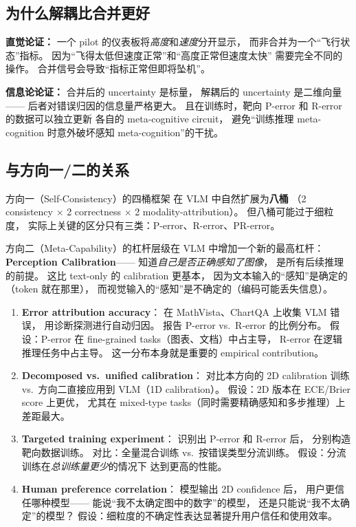 \documentclass[12pt,a4paper]{article}
\begin{document}
\subsection{为什么解耦比合并更好}

\textbf{直觉论证：}
一个 pilot 的仪表板将\textit{高度}和\textit{速度}分开显示，
而非合并为一个``飞行状态''指标。
因为``飞得太低但速度正常''和``高度正常但速度太快''
需要完全不同的操作。
合并信号会导致``指标正常但即将坠机''。

\textbf{信息论论证：}
合并后的 uncertainty 是标量，
解耦后的 uncertainty 是二维向量——
后者对错误归因的信息量严格更大。
且在训练时，靶向 P-error 和 R-error 的数据可以独立更新
各自的 meta-cognitive circuit，
避免``训练推理 meta-cognition 时意外破坏感知 meta-cognition''的干扰。

\subsection{与方向一/二的关系}

方向一（Self-Consistency）的四桶框架
在 VLM 中自然扩展为\textbf{八桶}
（2 consistency $\times$ 2 correctness $\times$ 2 modality-attribution）。
但八桶可能过于细粒度，
实际上关键的区分只有三类：P-error、R-error、PR-error。

方向二（Meta-Capability）的杠杆层级在 VLM 中增加一个新的最高杠杆：
\textbf{Perception Calibration}——
知道\textit{自己是否正确感知了图像}，
是所有后续推理的前提。
这比 text-only 的 calibration 更基本，
因为文本输入的``感知''是确定的（token 就在那里），
而视觉输入的``感知''是不确定的（编码可能丢失信息）。

\begin{expbox}
\begin{enumerate}[leftmargin=1.5em]
  \item \textbf{Error attribution accuracy}：
    在 MathVista、ChartQA 上收集 VLM 错误，
    用诊断探测进行自动归因。
    报告 P-error vs.\ R-error 的比例分布。
    假设：P-error 在 fine-grained tasks（图表、文档）中占主导，
    R-error 在逻辑推理任务中占主导。
    这一分布本身就是重要的 empirical contribution。

  \item \textbf{Decomposed vs.\ unified calibration}：
    对比本方向的 2D calibration 训练
    vs.\ 方向二直接应用到 VLM（1D calibration）。
    假设：2D 版本在 ECE/Brier score 上更优，
    尤其在 mixed-type tasks（同时需要精确感知和多步推理）上
    差距最大。

  \item \textbf{Targeted training experiment}：
    识别出 P-error 和 R-error 后，
    分别构造靶向数据训练。
    对比：全量混合训练 vs.\ 按错误类型分流训练。
    假设：分流训练在\textit{总训练量更少}的情况下
    达到更高的性能。

  \item \textbf{Human preference correlation}：
    模型输出 2D confidence 后，
    用户更信任哪种模型——
    能说``我不太确定图中的数字''的模型，
    还是只能说``我不太确定''的模型？
    假设：细粒度的不确定性表达显著提升用户信任和使用效率。
\end{enumerate}
\end{expbox}
\end{document}
